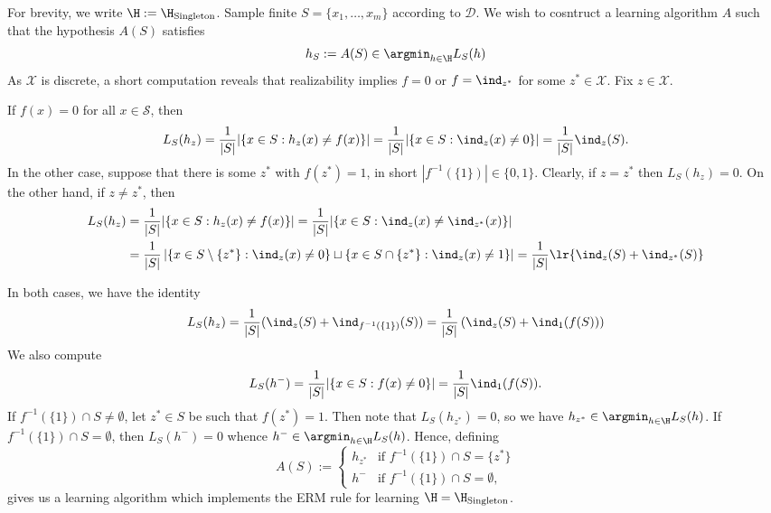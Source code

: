 \documentclass[12pt]{article}
\begin{document}
\begin{solution}
  For brevity, we write $ \H:= \H_{\text{Singleton}} $. Sample finite $ S = \{x_{1}, \ldots, x_{m}\} $ according to $ \mathcal{D} $. We wish to cosntruct a learning algorithm $ A $ such that the hypothesis $ A(S) $ satisfies
  \[
    h_{S}:= A(S)\in \argmin_{h\in \H}{L_{S}(h)}
  \]  
  As $ \mathcal{X} $ is discrete, a short computation reveals that realizability implies $ f=0 $ or $ f=\ind_{z^{*}} $ for some $ z^{*} \in \mathcal{X}$. Fix $ z\in \mathcal{X} $.

  If $ f(x)=0 $ for all $ x\in \mathcal{S} $, then
  \begin{equation*}
    L_{S}(h_{z}) = \frac{1}{|S|}|\{x\in S : h_{z}(x) \neq f(x)\}| = \frac{1}{|S|} |\{x\in S: \ind_{z}(x) \neq 0\}| = \frac{1}{|S|}\ind_{z}(S).
  \end{equation*}
  In the other case, suppose that there is some $ z^{*} $ with $ f(z^{*}) = 1 $, in short $ |f^{-1}(\{1\})| \in\{0,1\} $. Clearly, if $ z=z^{*} $ then $ L_{S}(h_{z}) = 0 $. On the other hand, if $ z\neq z^{*} $, then
  \begin{align*}
    L_{S}(h_{z}) &= \frac{1}{|S|}|\{x\in S : h_{z}(x) \neq f(x)\}| = \frac{1}{|S|} |\{x\in S: \ind_{z}(x) \neq \ind_{z^{*}}(x)\}| \\
    &=\frac{1}{|S|}\left| \{x\in S\setminus \{z^{*}\}: \ind_{z}(x) \neq 0\} \sqcup \{x\in S\cap\{z^{*}\}: \ind_{z}(x) \neq 1\}\right| = \frac{1}{|S|}\lr{\ind_{z}(S) + \ind_{z^{*}}(S)} \\
  \end{align*}

  In both cases, we have the identity
  \begin{equation}
    L_{S}(h_{z}) = \frac{1}{|S|}(\ind_{z}(S) + \ind_{f^{-1}(\{1\})}(S)) = \frac{1}{|S|}\left(\ind_{z}(S) + \ind_{1}(f(S))\right) 
  \end{equation}
  We also compute
  \[
    L_{S}(h^{-}) = \frac{1}{|S|}|\{x\in S : f(x) \neq 0\}| = \frac{1}{|S|}\ind_{1}(f(S)).
  \]
  If $ f^{-1}(\{1\})\cap S \neq \emptyset$, let $ z^{*}\in S $ be such that $ f(z^{*}) = 1 $. Then note that $ L_S(h_{z^{*}}) = 0 $, so we have $ h_{z^{*}}\in  \argmin_{h\in \H}{L_{S}(h)}$. If $ f^{-1}(\{1\})\cap S = \emptyset $, then $ L_{S}(h^{-}) = 0 $ whence $ h^{-}\in  \argmin_{h\in \H}{L_{S}(h)}$. Hence, defining
  \[
    A(S) := 
    \begin{cases}
      h_{z^{*}} & \text{if } f^{-1}(\{1\})\cap S = \{z^{*}\}\\
      h^{-} & \text{if } f^{-1}(\{1\}) \cap S = \emptyset,
    \end{cases}
  \]
  gives us a learning algorithm which implements the ERM rule for learning $ \H = \H_{\text{Singleton}} $.
  
  
\end{solution}
\end{document}

